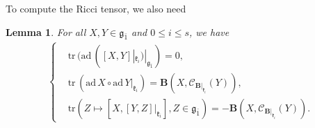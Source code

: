 \documentclass[reqno]{amsart}
\newtheorem{lem}[thm]{Lemma}
\theoremstyle{definition}
\begin{document}
To compute the Ricci tensor, we also need
\begin{lem}\label{3-lem-tradX}
 For all $X,Y\in\mathfrak{g}_{\bar{1}}$ and $0\leq i\leq s$, we have
\begin{eqnarray*}
\left\{
\begin{aligned}
&\mathrm{tr}\,(\mathrm{ad}\,([X,Y]|_{\mathfrak{k}_{i}})|_{\mathfrak{g}_{\bar{1}}})=0,\\
&\mathrm{tr}\,(\mathrm{ad}\,X\circ\mathrm{ad}\,Y|_{\mathfrak{k}_{i}})
=\mathbf{B}\left(X,\mathcal{C}_{\mathbf{B}|_{\mathfrak{k}_{i}}}(Y)\right),\\
&\mathrm{tr}\left(Z\mapsto [X,[Y,Z]|_{\mathfrak{k}_{i}}],Z\in\mathfrak{g}_{\bar{1}}\right)
=-\mathbf{B}\left(X,\mathcal{C}_{\mathbf{B}|_{\mathfrak{k}_{i}}}(Y)\right).
\end{aligned}\right.
\end{eqnarray*}
\end{lem}
\end{document}
